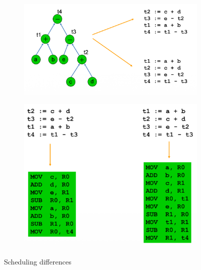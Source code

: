 \begin{figure}[h]
	\begin{center}
		\begin{subfigure}[b]{0.55\textwidth}
			\includegraphics[width=\textwidth]{images/Scheduling_1.png}
		\end{subfigure}
		\hfill
		\begin{subfigure}[b]{0.35\textwidth}
			\includegraphics[width=\textwidth]{images/Scheduling_2.png}
		\end{subfigure}
		\caption{Scheduling differences}
		\label{fig:scheduling}
	\end{center}
\end{figure}

